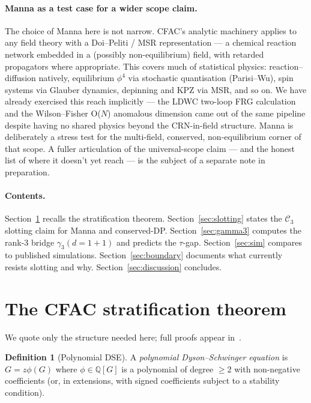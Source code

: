 \documentclass[10pt,a4paper,twocolumn]{article}
\theoremstyle{plain}
\theoremstyle{definition}
\newtheorem{definition}{Definition}
\newcommand{\Cstr}[1]{\mathcal{C}_{#1}}
\begin{document}
\paragraph{Manna as a test case for a wider scope claim.}
The choice of Manna here is not narrow.  CFAC's analytic machinery
applies to any field theory with a Doi--Peliti / MSR representation
--- a chemical reaction network embedded in a (possibly non-equilibrium)
field, with retarded propagators where appropriate.  This covers
much of statistical physics: reaction--diffusion natively, equilibrium
$\phi^4$ via stochastic quantisation (Parisi--Wu), spin systems via
Glauber dynamics, depinning and KPZ via MSR, and so on.  We have
already exercised this reach implicitly --- the LDWC two-loop FRG
calculation~\citep{Amarteifio2026LDWC} and the Wilson--Fisher O($N$)
anomalous dimension came out of the same pipeline despite having no
shared physics beyond the CRN-in-field structure.  Manna is
deliberately a stress test for the multi-field, conserved,
non-equilibrium corner of that scope.  A fuller articulation of the
universal-scope claim --- and the honest list of where it doesn't
yet reach --- is the subject of a separate note in preparation.

\paragraph{Contents.}
Section~\ref{sec:recap} recalls the stratification theorem.
Section~\ref{sec:slotting} states the $\Cstr{3}$ slotting claim for
Manna and conserved-DP.
Section~\ref{sec:gamma3} computes the rank-3 bridge
$\gamma_3(d=1+1)$ and predicts the $\tau$-gap.
Section~\ref{sec:sim} compares to published simulations.
Section~\ref{sec:boundary} documents what currently resists slotting
and why.
Section~\ref{sec:discussion} concludes.

\section{The CFAC stratification theorem}
\label{sec:recap}

We quote only the structure needed here; full proofs appear
in~\citep{AmarteifioCFAC2026}.

\begin{definition}[Polynomial DSE]
A \emph{polynomial Dyson--Schwinger equation} is $G = z\phi(G)$ where
$\phi \in \mathbb{Q}[G]$ is a polynomial of degree $\ge 2$ with
non-negative coefficients (or, in extensions, with signed coefficients
subject to a stability condition).
\end{definition}
\end{document}
